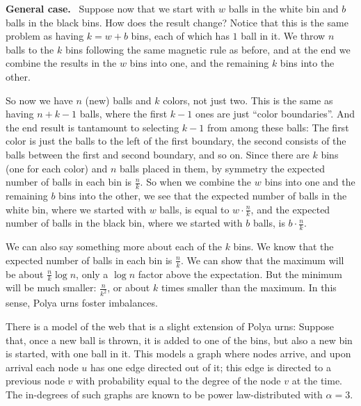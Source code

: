 \documentclass[11pt]{article}
\begin{document}
\medskip
{\bf General case.}~
Suppose now that we start with $w$ balls in the white bin and $b$ balls in the black bins. How does the result change? Notice that this is the same problem as having $k = w + b$ bins, each of which has $1$ ball in it. We throw $n$ balls to the $k$ bins following the same magnetic rule as before, and at the end we combine the results in the $w$ bins into one, and the remaining $k$ bins into the other.

So now we have $n$ (new) balls and $k$ colors, not just two. This is the same as having $n + k -1$ balls, where the first $k-1$ ones are just ``color boundaries''. And the end result is tantamount to selecting $k-1$ from among these balls: The first color is just the balls to the left of the first boundary, the second consists of the balls between the first and second boundary, and so on. Since there are $k$ bins (one for each color) and $n$ balls placed in them, by symmetry the expected number of balls in each bin is $\frac{n}{k}$. So when we combine the $w$ bins into one and the remaining $b$ bins into the other, we see that the expected number of balls in the white bin, where we started with $w$ balls, is equal to $w \cdot \frac{n}{k}$, and the expected number of balls in the black bin, where we started with $b$ balls, is $b \cdot \frac{n}{k}$.

We can also say something more about each of the $k$ bins. We know that the expected number of balls in each bin is $\frac{n}{k}$. We can show that the maximum will be about $\frac{n}{k} \log n$, only a $\log n$ factor above the expectation. But the minimum will be much smaller: $\frac{n}{k^2}$, or about $k$ times smaller than the maximum. In this sense, Polya urns foster imbalances.

There is a model of the web that is a slight extension of Polya urns: Suppose that, once a new ball is thrown, it is added to one of the bins, but also a new bin is started, with one ball in it. This models a graph where nodes arrive, and upon arrival each node $u$ has one edge directed out of it; this edge is directed to a previous node $v$ with probability equal to the degree of the node $v$ at the time. The in-degrees of such graphs are known to be power law-distributed with $\alpha = 3$.
\end{document}
